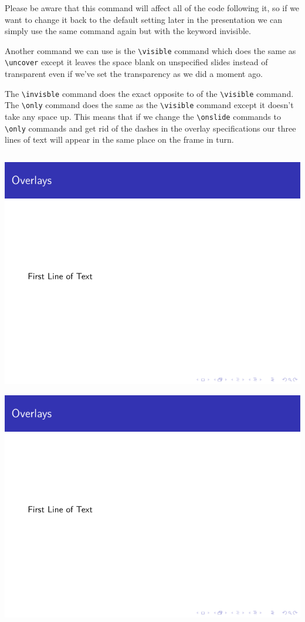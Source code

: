 \begin{column}{0.5\textwidth}
Please be aware that this command will affect all of the code following it, so if we want to change it back to the default setting later in the presentation we can simply use the same command again but with the keyword invisible.

Another command we can use is the \verb|\visible| command which does the same as \verb|\uncover| except it leaves the space blank on unspecified slides instead of transparent even if we've set the transparency as we did a moment ago.

The \verb|\invisble| command does the exact opposite to of the \verb|\visible| command. The \verb|\only| command does the same as the \verb|\visible| command except it doesn't take any space up. This means that if we change the \verb|\onslide| commands to \verb|\only| commands and get rid of the dashes in the overlay specifications our three lines of text will appear in the same place on the frame in turn.

\inputminted[linenos=true]{latex}{examples/beamer/overlay-only.tex}

\includegraphics[page=1]{examples/beamer/overlay-only.pdf}

\includegraphics[page=2]{examples/beamer/overlay-only.pdf}


\end{column}
